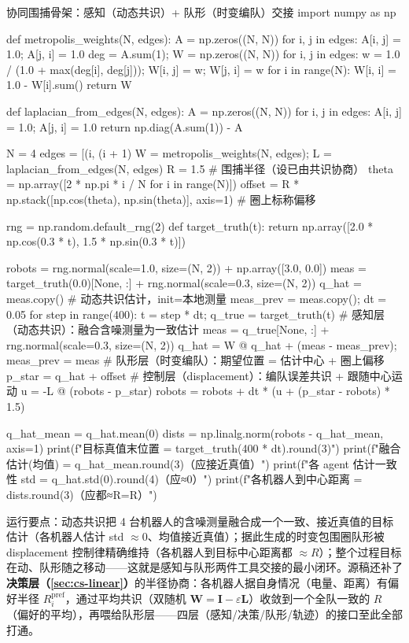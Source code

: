 \begin{codebox}[Python]{协同围捕骨架：感知（动态共识）+ 队形（时变编队）交接}
import numpy as np

def metropolis_weights(N, edges):
    A = np.zeros((N, N))
    for i, j in edges:
        A[i, j] = 1.0; A[j, i] = 1.0
    deg = A.sum(1); W = np.zeros((N, N))
    for i, j in edges:
        w = 1.0 / (1.0 + max(deg[i], deg[j])); W[i, j] = w; W[j, i] = w
    for i in range(N):
        W[i, i] = 1.0 - W[i].sum()
    return W

def laplacian_from_edges(N, edges):
    A = np.zeros((N, N))
    for i, j in edges:
        A[i, j] = 1.0; A[j, i] = 1.0
    return np.diag(A.sum(1)) - A

N = 4
edges = [(i, (i + 1) %
W = metropolis_weights(N, edges); L = laplacian_from_edges(N, edges)
R = 1.5                                                # 围捕半径（设已由共识协商）
theta = np.array([2 * np.pi * i / N for i in range(N)])
offset = R * np.stack([np.cos(theta), np.sin(theta)], axis=1)  # 圈上标称偏移

rng = np.random.default_rng(2)
def target_truth(t):
    return np.array([2.0 * np.cos(0.3 * t), 1.5 * np.sin(0.3 * t)])

robots = rng.normal(scale=1.0, size=(N, 2)) + np.array([3.0, 0.0])
meas = target_truth(0.0)[None, :] + rng.normal(scale=0.3, size=(N, 2))
q_hat = meas.copy()                                    # 动态共识估计，init=本地测量
meas_prev = meas.copy(); dt = 0.05
for step in range(400):
    t = step * dt; q_true = target_truth(t)
    # 感知层（动态共识）：融合含噪测量为一致估计
    meas = q_true[None, :] + rng.normal(scale=0.3, size=(N, 2))
    q_hat = W @ q_hat + (meas - meas_prev); meas_prev = meas
    # 队形层（时变编队）：期望位置 = 估计中心 + 圈上偏移
    p_star = q_hat + offset
    # 控制层（displacement）：编队误差共识 + 跟随中心运动
    u = -L @ (robots - p_star)
    robots = robots + dt * (u + (p_star - robots) * 1.5)

q_hat_mean = q_hat.mean(0)
dists = np.linalg.norm(robots - q_hat_mean, axis=1)
print(f"目标真值末位置 = {target_truth(400 * dt).round(3)}")
print(f"融合估计(均值) = {q_hat_mean.round(3)}（应接近真值）")
print(f"各 agent 估计一致性 std = {q_hat.std(0).round(4)}（应≈0）")
print(f"各机器人到中心距离 = {dists.round(3)}（应都≈R={R}）")
\end{codebox}

\noindent 运行要点：动态共识把 4 台机器人的含噪测量融合成一个一致、接近真值的目标估计（各机器人估计 std $\approx0$、均值接近真值）；据此生成的时变包围圈队形被 displacement 控制律精确维持（各机器人到目标中心距离都 $\approx R$）；整个过程目标在动、队形随之移动——这就是感知与队形两件工具交接的最小闭环。源稿还补了\textbf{决策层（\cref{sec:cs-linear}）}的半径协商：各机器人据自身情况（电量、距离）有偏好半径 $R_i^{\text{pref}}$，通过平均共识（双随机 $\mathbf{W}=\mathbf{I}-\varepsilon\mathbf{L}$）收敛到一个全队一致的 $R$（偏好的平均），再喂给队形层——四层（感知/决策/队形/轨迹）的接口至此全部打通。

